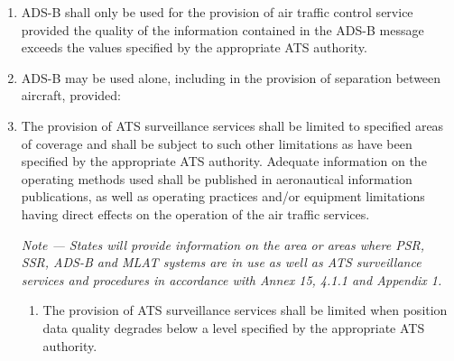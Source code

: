 \documentclass[../main.tex]{subfiles}
\begin{document}
\begin{enumerate}[label=\arabic{section}.\arabic{subsection}.\arabic*]

        \item ADS-B shall only be used for the provision of air traffic control service provided the quality of the information contained in the ADS-B message exceeds the values specified by the appropriate ATS authority.
        \item ADS-B may be used alone, including in the provision of separation between aircraft, provided:


        \item The provision of ATS surveillance services shall be limited to specified areas of coverage and shall be subject to such other limitations as have been specified by the appropriate ATS authority. Adequate information on the operating methods used shall be published in aeronautical information publications, as well as operating practices and/or equipment limitations having direct effects on the operation of the air traffic services.

        \textit{Note --- States will provide information on the area or areas where PSR, SSR, ADS-B and MLAT systems are in use as well as ATS surveillance services and procedures in accordance with Annex 15, 4.1.1 and Appendix 1.}

        \begin{enumerate}[label=\arabic{section}.\arabic{subsection}.\arabic{enumi}.\arabic*]
            \item The provision of ATS surveillance services shall be limited when position data quality degrades below a level specified by the appropriate ATS authority.
        \end{enumerate}


\end{enumerate}
\end{document}
